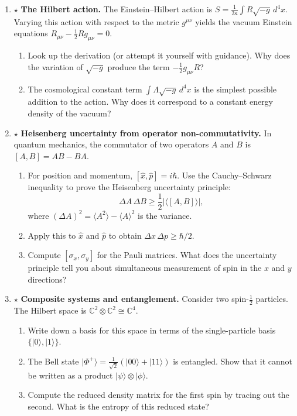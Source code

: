 \begin{enumerate}
    \item $\star$ \textbf{The Hilbert action.} The Einstein--Hilbert action is $S = \frac{1}{2\kappa} \int R \sqrt{-g} \, d^4x$. Varying this action with respect to the metric $g^{\mu\nu}$ yields the vacuum Einstein equations $R_{\mu\nu} - \frac{1}{2}R g_{\mu\nu} = 0$.
    \begin{enumerate}
        \item Look up the derivation (or attempt it yourself with guidance). Why does the variation of $\sqrt{-g}$ produce the term $-\frac{1}{2} g_{\mu\nu} R$?
        \item The cosmological constant term $\int \Lambda \sqrt{-g} \, d^4x$ is the simplest possible addition to the action. Why does it correspond to a constant energy density of the vacuum?
    \end{enumerate}

    \item $\star$ \textbf{Heisenberg uncertainty from operator non-commutativity.} In quantum mechanics, the commutator of two operators $A$ and $B$ is $[A,B] = AB - BA$.
    \begin{enumerate}
        \item For position and momentum, $[\hat{x}, \hat{p}] = i\hbar$. Use the Cauchy--Schwarz inequality to prove the Heisenberg uncertainty principle:
        \[
        \Delta A \, \Delta B \geq \frac{1}{2} \big| \langle [A,B] \rangle \big|,
        \]
        where $(\Delta A)^2 = \langle A^2 \rangle - \langle A \rangle^2$ is the variance.
        \item Apply this to $\hat{x}$ and $\hat{p}$ to obtain $\Delta x \, \Delta p \geq \hbar/2$.
        \item Compute $[\sigma_x, \sigma_y]$ for the Pauli matrices. What does the uncertainty principle tell you about simultaneous measurement of spin in the $x$ and $y$ directions?
    \end{enumerate}

    \item $\star$ \textbf{Composite systems and entanglement.} Consider two spin-$\frac{1}{2}$ particles. The Hilbert space is $\mathbb{C}^2 \otimes \mathbb{C}^2 \cong \mathbb{C}^4$.
    \begin{enumerate}
        \item Write down a basis for this space in terms of the single-particle basis $\{|0\rangle, |1\rangle\}$.
        \item The Bell state $|\Phi^+\rangle = \frac{1}{\sqrt{2}}(|00\rangle + |11\rangle)$ is entangled. Show that it cannot be written as a product $|\psi\rangle \otimes |\phi\rangle$.
        \item Compute the reduced density matrix for the first spin by tracing out the second. What is the entropy of this reduced state?
    \end{enumerate}


\end{enumerate}
